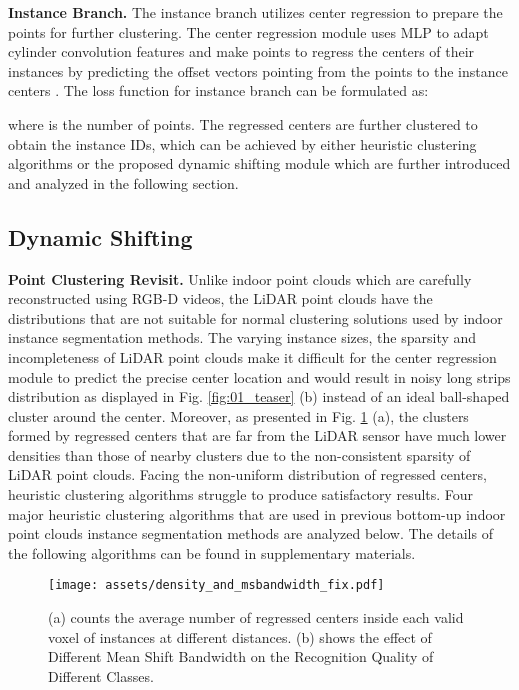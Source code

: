 \documentclass[final]{cvpr}
\begin{document}
\noindent\textbf{Instance Branch.}
The instance branch utilizes center regression to prepare the \things{} points for further clustering.
The center regression module uses MLP to adapt cylinder convolution features and make \things{}
points to regress the centers of their instances by predicting the offset vectors 
pointing from the points  to the instance centers .
The loss function for instance branch can be formulated as:

where  is the number of \things{} points.
The regressed centers  are further clustered to obtain the instance IDs, which can be achieved
by either heuristic clustering algorithms or the proposed dynamic shifting module which are further introduced and
analyzed in the following section.








 \subsection{Dynamic Shifting}\label{3.2}

\noindent\textbf{Point Clustering Revisit.}
Unlike indoor point clouds which are carefully reconstructed using RGB-D videos, the LiDAR point
clouds have the distributions that are not suitable for normal clustering solutions used by indoor instance segmentation methods.
The varying instance sizes, the sparsity and incompleteness of LiDAR point clouds make it difficult for the center
regression module to predict the precise center location and would result in noisy long strips distribution as displayed in
Fig. \ref{fig:01_teaser} (b) instead of an ideal ball-shaped cluster around the center.
Moreover, as presented in Fig. \ref{fig:03_02_density_and_msbandwidth} (a), the clusters formed by regressed centers that are far from the LiDAR sensor
have much lower densities than those of nearby clusters due to the non-consistent sparsity of LiDAR point clouds.
Facing the non-uniform distribution of regressed centers, heuristic clustering algorithms struggle to produce satisfactory results.
Four major heuristic clustering algorithms that are used in previous bottom-up indoor point clouds instance segmentation methods
are analyzed below.
The details of the following algorithms can be found in supplementary materials.

\begin{figure}[t]
    \begin{center}
\texttt{[image: assets/density\_and\_msbandwidth\_fix.pdf]}
    \end{center}
    \vspace{-0.7cm}
    \caption{(a) counts the average number of regressed centers inside each valid voxel of instances at different distances. (b) shows the effect of Different Mean Shift Bandwidth on the Recognition Quality of Different Classes.}
    \label{fig:03_02_density_and_msbandwidth}
\end{figure} 
\end{document}
